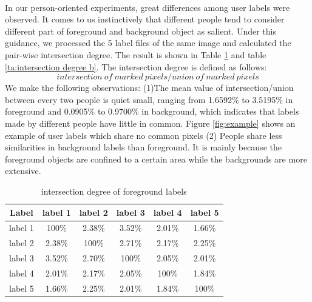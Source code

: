 \documentclass[runningheads,a4paper]{llncs}
\begin{document}
\paragraph{}In our person-oriented experiments, great differences among user labels were observed. It comes to us instinctively that different people tend to consider different part of foreground and background object as salient. Under this guidance, we processed the 5 label files of the same image and calculated the pair-wise intersection degree. The result is shown in Table \ref{ta:intersection degree f} and table \ref{ta:intersection degree b}. The intersection degree is defined as follows:
$$intersection\ of\ marked\ pixels/union\ of\ marked\ pixels$$
We make the following observations: (1)The mean value of intersection/union between every two people is quiet small, ranging from 1.6592\% to 3.5195\% in foreground and 0.0905\% to 0.9700\% in background, which indicates that labels made by different people have little in common. Figure \ref{fig:example} shows an example of user labels which share no common pixels (2) People share less similarities in background labels than foreground. It is mainly because the foreground objects are confined to a certain area while the backgrounds are more extensive.

\begin{table}
\centering
\begin{tabular}{|c|c|c|c|c|c|}
\hline
 Label & label 1 & label 2 & label 3 & label 4& label 5 \\
\hline
label 1 & 100\% & 2.38\% & 3.52\% & 2.01\%& 1.66\% \\
\hline
label 2 & 2.38\% & 100\% & 2.71\% & 2.17\%& 2.25\% \\
\hline
label 3 & 3.52\% & 2.70\% & 100\% & 2.05\%& 2.01\%\\
\hline
label 4 & 2.01\% & 2.17\% & 2.05\% & 100\%& 1.84\% \\
\hline
label 5 & 1.66\% & 2.25\% & 2.01\% & 1.84\%& 100\% \\
\hline
\end{tabular}
\captionsetup{justification=centerlast}
\caption{intersection degree of foreground labels}
\label{ta:intersection degree f}
\end{table}
\end{document}
